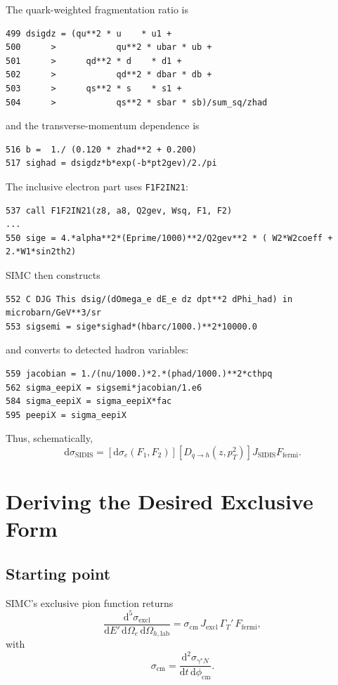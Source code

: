 \documentclass[11pt]{article}
\newcommand{\dd}{\mathrm{d}}
\newcommand{\phicm}{\phi_{\mathrm{cm}}}
\newcommand{\Escat}{E'}
\begin{document}
The quark-weighted fragmentation ratio is
\begin{lstlisting}
499 dsigdz = (qu**2 * u    * u1 +
500      >            qu**2 * ubar * ub +
501      >      qd**2 * d    * d1 +
502      >            qd**2 * dbar * db +
503      >      qs**2 * s    * s1 +
504      >            qs**2 * sbar * sb)/sum_sq/zhad
\end{lstlisting}
and the transverse-momentum dependence is
\begin{lstlisting}
516 b =  1./ (0.120 * zhad**2 + 0.200)
517 sighad = dsigdz*b*exp(-b*pt2gev)/2./pi
\end{lstlisting}

The inclusive electron part uses \texttt{F1F2IN21}:
\begin{lstlisting}
537 call F1F2IN21(z8, a8, Q2gev, Wsq, F1, F2)
...
550 sige = 4.*alpha**2*(Eprime/1000)**2/Q2gev**2 * ( W2*W2coeff + 2.*W1*sin2th2)
\end{lstlisting}

SIMC then constructs
\begin{lstlisting}
552 C DJG This dsig/(dOmega_e dE_e dz dpt**2 dPhi_had) in microbarn/GeV**3/sr
553 sigsemi = sige*sighad*(hbarc/1000.)**2*10000.0
\end{lstlisting}
and converts to detected hadron variables:
\begin{lstlisting}
559 jacobian = 1./(nu/1000.)*2.*(phad/1000.)**2*cthpq
562 sigma_eepiX = sigsemi*jacobian/1.e6
584 sigma_eepiX = sigma_eepiX*fac
595 peepiX = sigma_eepiX
\end{lstlisting}

Thus, schematically,
\[
  \dd\sigma_{\mathrm{SIDIS}}
  =
  \left[
    \dd\sigma_e(F_1,F_2)
  \right]
  \left[
    D_{q\to h}(z,p_T^2)
  \right]
  J_{\mathrm{SIDIS}}
  F_{\mathrm{fermi}}.
\]

\section{Deriving the Desired Exclusive Form}

\subsection{Starting point}

SIMC's exclusive pion function returns
\[
  \frac{\dd^5\sigma_{\mathrm{excl}}}
       {\dd \Escat\,\dd\Omega_e\,\dd\Omega_{h,\mathrm{lab}}}
  =
  \sigma_{\mathrm{cm}}\,
  J_{\mathrm{excl}}\,
  \Gamma_T'\,
  F_{\mathrm{fermi}},
\]
with
\[
  \sigma_{\mathrm{cm}}
  =
  \frac{\dd^2\sigma_{\gamma^*N}}
       {\dd t\,\dd\phicm}.
\]
\end{document}
